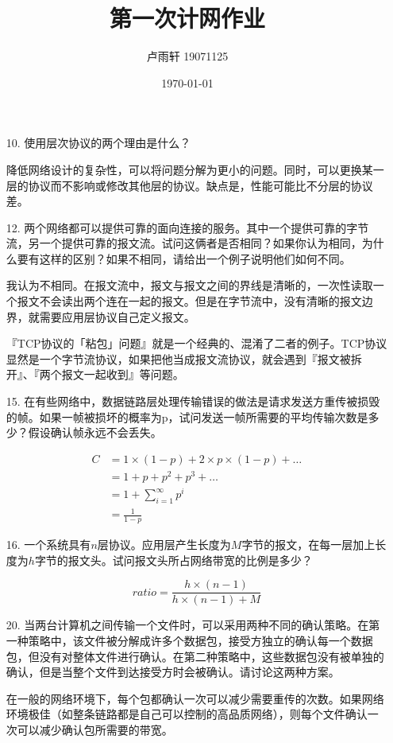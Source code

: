 \documentclass{ctexart}
\title{第一次计网作业}
\author{卢雨轩 19071125}
\date{\today}
\begin{document}
\maketitle

\begin{itemize}
    \item [10.] 使用层次协议的两个理由是什么？
    
    降低网络设计的复杂性，可以将问题分解为更小的问题。同时，可以更换某一层的协议而不影响或修改其他层的协议。缺点是，性能可能比不分层的协议差。
    
    \item [12.] 两个网络都可以提供可靠的面向连接的服务。其中一个提供可靠的字节流，另一个提供可靠的报文流。试问这俩者是否相同？如果你认为相同，为什么要有这样的区别？如果不相同，请给出一个例子说明他们如何不同。
    
    我认为不相同。在报文流中，报文与报文之间的界线是清晰的，一次性读取一个报文不会读出两个连在一起的报文。但是在字节流中，没有清晰的报文边界，就需要应用层协议自己定义报文。
    
    『TCP协议的「粘包」问题』就是一个经典的、混淆了二者的例子。TCP协议显然是一个字节流协议，如果把他当成报文流协议，就会遇到『报文被拆开』、『两个报文一起收到』等问题。
    
    \item [15.] 在有些网络中，数据链路层处理传输错误的做法是请求发送方重传被损毁的帧。如果一帧被损坏的概率为p，试问发送一帧所需要的平均传输次数是多少？假设确认帧永远不会丢失。
    
    $$
    \begin{aligned}
    C & = 1 \times (1-p) + 2 \times p \times (1-p) + \dots \\
      & = 1 + p + p^2 + p^3 + \dots \\
      & = 1 + \sum_{i=1}^{\infty} p^i \\
      & = \frac{1}{1-p}
    \end{aligned}
    $$
    
    \item [16.] 一个系统具有$n$层协议。应用层产生长度为$M$字节的报文，在每一层加上长度为$h$字节的报文头。试问报文头所占网络带宽的比例是多少？
    
    $$
    ratio = \frac{h \times (n - 1)}{h \times (n-1) + M}
    $$
    
    \item [20.] 当两台计算机之间传输一个文件时，可以采用两种不同的确认策略。在第一种策略中，该文件被分解成许多个数据包，接受方独立的确认每一个数据包，但没有对整体文件进行确认。在第二种策略中，这些数据包没有被单独的确认，但是当整个文件到达接受方时会被确认。请讨论这两种方案。
    
    在一般的网络环境下，每个包都确认一次可以减少需要重传的次数。如果网络环境极佳（如整条链路都是自己可以控制的高品质网络），则每个文件确认一次可以减少确认包所需要的带宽。
\end{itemize}
\end{document}

